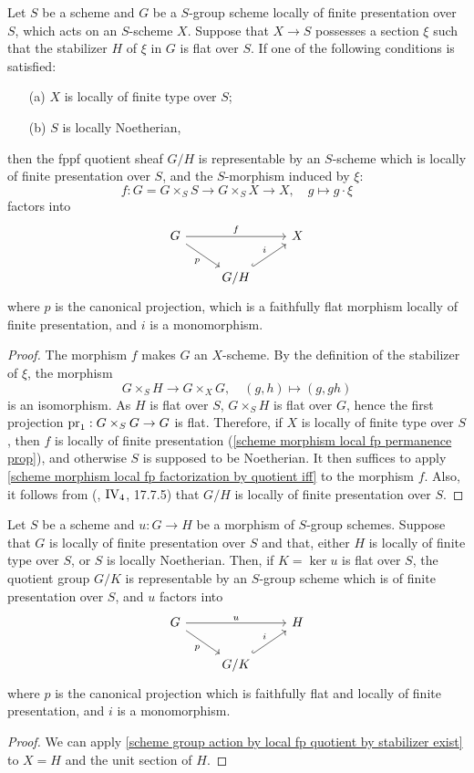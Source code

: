 \begin{theorem}\label{scheme group action by local fp quotient by stabilizer exist}
Let $S$ be a scheme and $G$ be a $S$-group scheme locally of finite presentation over $S$, which acts on an $S$-scheme $X$. Suppose that $X\to S$ possesses a section $\xi$ such that the stabilizer $H$ of $\xi$ in $G$ is flat over $S$. If one of the following conditions is satisfied:
\begin{enumerate}
    \item[(a)] $X$ is locally of finite type over $S$;
    \item[(b)] $S$ is locally Noetherian,
\end{enumerate}
then the fppf quotient sheaf $G/H$ is representable by an $S$-scheme which is locally of finite presentation over $S$, and the $S$-morphism induced by $\xi$:
\[f:G=G\times_SS\to G\times_SX\to X,\quad g\mapsto g\cdot\xi\]
factors into
\[\begin{tikzcd}
G\ar[rd,swap,"p"]\ar[rr,"f"]&&X\\
&G/H\ar[ru,hook,"i"]&
\end{tikzcd}\]
where $p$ is the canonical projection, which is a faithfully flat morphism locally of finite presentation, and $i$ is a monomorphism.
\end{theorem}
\begin{proof}
The morphism $f$ makes $G$ an $X$-scheme. By the definition of the stabilizer of $\xi$, the morphism
\[G\times_SH\to G\times_XG,\quad (g,h)\mapsto (g,gh)\]
is an isomorphism. As $H$ is flat over $S$, $G\times_SH$ is flat over $G$, hence the first projection $\mathrm{pr}_1:G\times_SG\to G$ is flat. Therefore, if $X$ is locally of finite type over $S$, then $f$ is locally of finite presentation (\cref{scheme morphism local fp permanence prop}), and otherwise $S$ is supposed to be Noetherian. It then suffices to apply \cref{scheme morphism local fp factorization by quotient iff} to the morphism $f$. Also, it follows from (\cite{EGA4}, $\text{\Rmnum{4}}_4$, 17.7.5) that $G/H$ is locally of finite presentation over $S$.
\end{proof}

\begin{corollary}\label{scheme group morphism factorization by quotient if flat}
Let $S$ be a scheme and $u:G\to H$ be a morphism of $S$-group schemes. Suppose that $G$ is locally of finite presentation over $S$ and that, either $H$ is locally of finite type over $S$, or $S$ is locally Noetherian. Then, if $K=\ker u$ is flat over $S$, the quotient group $G/K$ is representable by an $S$-group scheme which is of finite presentation over $S$, and $u$ factors into
\[\begin{tikzcd}
G\ar[rd,swap,"p"]\ar[rr,"u"]&&H\\
&G/K\ar[ru,hook,"i"]&
\end{tikzcd}\]
where $p$ is the canonical projection which is faithfully flat and locally of finite presentation, and $i$ is a monomorphism.
\end{corollary}
\begin{proof}
We can apply \cref{scheme group action by local fp quotient by stabilizer exist} to $X=H$ and the unit section of $H$.
\end{proof}

